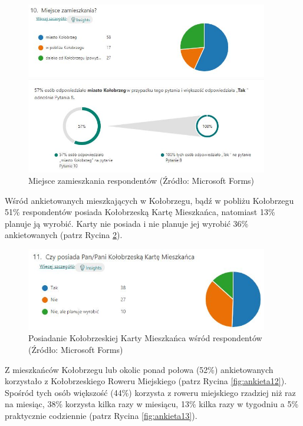 \documentclass{amuthesis}
\begin{document}
\begin{figure}[t]

{\centering \includegraphics[width=400px]{figures/ankieta/10} 

}

\caption{Miejsce zamieszkania respondentów (Źródło: Microsoft Forms)}\label{fig:ankieta10}
\end{figure}

Wśród ankietowanych mieszkających w Kołobrzegu, bądź w pobliżu Kołobrzegu 51\% respondentów posiada Kołobrzeską Kartę Mieszkańca, natomiast 13\% planuje ją wyrobić.
Karty nie posiada i nie planuje jej wyrobić 36\% ankietowanych (patrz Rycina \ref{fig:ankieta11}).

\begin{figure}[t]

{\centering \includegraphics[width=400px]{figures/ankieta/11} 

}

\caption{Posiadanie Kołobrzeskiej Karty Mieszkańca wśród respondentów (Źródło: Microsoft Forms)}\label{fig:ankieta11}
\end{figure}

Z mieszkańców Kołobrzegu lub okolic ponad połowa (52\%) ankietowanych korzystało z Kołobrzeskiego Roweru Miejskiego (patrz Rycina \ref{fig:ankieta12}).
Spośród tych osób większość (44\%) korzysta z roweru miejskiego rzadziej niż raz na miesiąc, 38\% korzysta kilka razy w miesiącu, 13\% kilka razy w tygodniu a 5\% praktycznie codziennie (patrz Rycina \ref{fig:ankieta13}).
\end{document}
